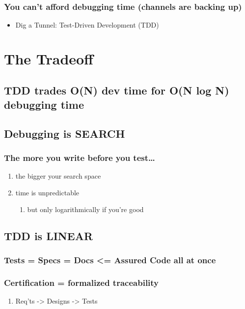 \documentclass[10pt,oneside,x11names]{article}
\begin{document}
\subsubsection{You can't afford debugging time (channels are backing up)}
\label{sec:org171dc75}
\begin{itemize}
\item Dig a Tunnel: Test-Driven Development (TDD)
\end{itemize}
\section{The Tradeoff}
\label{sec:org98e6430}
\subsection{TDD trades O(N) dev time for O(N log N) debugging time}
\label{sec:orgea5ea9a}
\subsection{Debugging is SEARCH}
\label{sec:orge0bed51}
\subsubsection{The more you write before you test\ldots{}}
\label{sec:org4d22474}
\begin{enumerate}
\item the bigger your search space
\label{sec:orge66f701}
\item time is unpredictable
\label{sec:orgb344393}
\begin{enumerate}
\item but only logarithmically if you're good
\label{sec:orge9f925f}
\end{enumerate}
\end{enumerate}
\subsection{TDD is LINEAR}
\label{sec:orgea95427}
\subsubsection{Tests = Specs = Docs <= Assured Code all at once}
\label{sec:org5ab7370}
\subsubsection{Certification = formalized traceability}
\label{sec:orga116dd8}
\begin{enumerate}
\item Req'ts -> Designs -> Tests
\label{sec:org69a1cce}
\end{enumerate}
\end{document}
